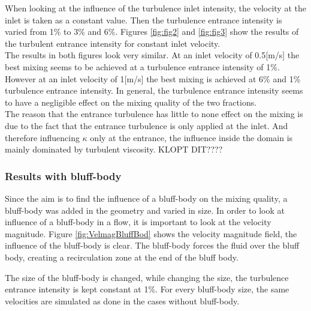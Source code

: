 \documentclass{CFD2017}
\begin{document}
When looking at the influence of the turbulence inlet intensity, the velocity at the inlet is taken as a constant value. Then the turbulence entrance intensity is varied from 1\% to 3\% and 6\%. Figures \ref{fig:fig2} and \ref{fig:fig3} show the results of the turbulent entrance intensity for constant inlet velocity.\\
The results in both figures look very similar. At an inlet velocity of 0.5[m/s] the best mixing seems to be achieved at a turbulence entrance intensity of 1\%. However at an inlet velocity of 1[m/s] the best mixing is achieved at 6\% and 1\% turbulence entrance intensity. In general, the turbulence entrance intensity seems to have a negligible effect on the mixing quality of the two fractions.\\
The reason that the entrance turbulence has little to none effect on the mixing is due to the fact that the entrance turbulence is only applied at the inlet.  And therefore influencing $\kappa$ only at the entrance, the influence inside the domain is mainly dominated by turbulent viscosity. KLOPT DIT????







\subsubsection{Results with bluff-body }
Since the aim is to find the influence of a bluff-body on the mixing quality, a bluff-body was added in the geometry and varied in size. In order to look at influence of a bluff-body in a flow, it is important to look at the velocity magnitude. Figure \ref{fig:VelmagBluffBod} shows the velocity magnitude field, the influence of the bluff-body is clear. The bluff-body forces the fluid over the bluff body, creating a recirculation zone at the end of the bluff body.


The size of the bluff-body is changed, while changing the size, the turbulence entrance intensity is kept constant at 1\%. For every bluff-body size, the same velocities are simulated as done in the cases without bluff-body.
\end{document}
